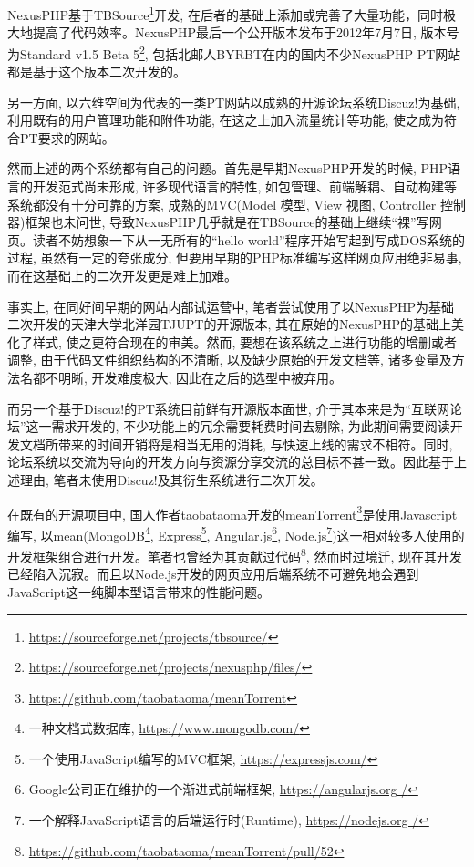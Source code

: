 NexusPHP基于TBSource\footnote{\url{https://sourceforge.net/projects/tbsource/}}开发, 在后者的基础上添加或完善了大量功能，同时极大地提高了代码效率\cite{nexusteam2011about}。NexusPHP最后一个公开版本发布于2012年7月7日, 版本号为Standard v1.5 Beta 5\footnote{\url{https://sourceforge.net/projects/nexusphp/files/}}, 包括北邮人BYRBT在内的国内不少NexusPHP PT网站都是基于这个版本二次开发的。

另一方面, 以六维空间为代表的一类PT网站以成熟的开源论坛系统Discuz!为基础, 利用既有的用户管理功能和附件功能, 在这之上加入流量统计等功能, 使之成为符合PT要求的网站。

然而上述的两个系统都有自己的问题。首先是早期NexusPHP开发的时候, PHP语言的开发范式尚未形成, 许多现代语言的特性, 如包管理、前端解耦、自动构建等系统都没有十分可靠的方案, 成熟的MVC(Model 模型, View 视图, Controller 控制器)框架也未问世, 导致NexusPHP几乎就是在TBSource的基础上继续``裸''写网页。读者不妨想象一下从一无所有的``hello world''程序开始写起到写成DOS系统的过程, 虽然有一定的夸张成分, 但要用早期的PHP标准编写这样网页应用绝非易事, 而在这基础上的二次开发更是难上加难。

事实上, 在同好间早期的网站内部试运营中, 笔者尝试使用了以NexusPHP为基础二次开发的天津大学北洋园TJUPT的开源版本, 其在原始的NexusPHP的基础上美化了样式, 使之更符合现在的审美。然而, 要想在该系统之上进行功能的增删或者调整, 由于代码文件组织结构的不清晰, 以及缺少原始的开发文档等, 诸多变量及方法名都不明晰, 开发难度极大, 因此在之后的选型中被弃用。

而另一个基于Discuz!的PT系统目前鲜有开源版本面世, 介于其本来是为``互联网论坛''这一需求开发的, 不少功能上的冗余需要耗费时间去剔除, 为此期间需要阅读开发文档所带来的时间开销将是相当无用的消耗, 与快速上线的需求不相符。同时, 论坛系统以交流为导向的开发方向与资源分享交流的总目标不甚一致。因此基于上述理由, 笔者未使用Discuz!及其衍生系统进行二次开发。

在既有的开源项目中, 国人作者taobataoma开发的meanTorrent\footnote{\url{https://github.com/taobataoma/meanTorrent}}是使用Javascript编写, 以mean(MongoDB\footnote{一种文档式数据库, \url{https://www.mongodb.com/}}, Express\footnote{一个使用JavaScript编写的MVC框架, \url{https://expressjs.com/}}, Angular.js\footnote{Google公司正在维护的一个渐进式前端框架, \url{https://angularjs.org
/}}, Node.js\footnote{一个解释JavaScript语言的后端运行时(Runtime), \url{https://nodejs.org
/}})这一相对较多人使用的开发框架组合进行开发。笔者也曾经为其贡献过代码\footnote{\url{https://github.com/taobataoma/meanTorrent/pull/52}}, 然而时过境迁, 现在其开发已经陷入沉寂。而且以Node.js开发的网页应用后端系统不可避免地会遇到JavaScript这一纯脚本型语言带来的性能问题。

